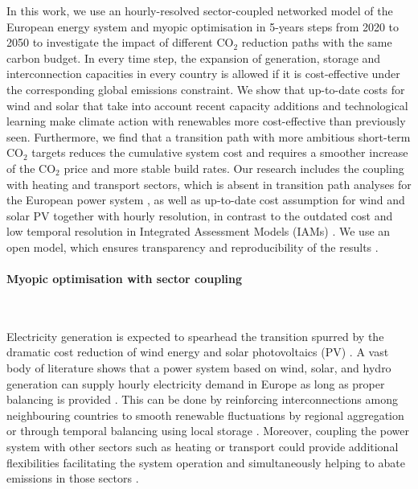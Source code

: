 \documentclass[5p]{elsarticle} %
\begin{document}
In this work, we use an hourly-resolved sector-coupled networked model of the European energy system and myopic optimisation in 5-years steps from 2020 to 2050 to investigate the impact of different CO$_2$ reduction paths with the same carbon budget. In every time step, the expansion of generation, storage and interconnection capacities in every country is allowed if it is cost-effective under the corresponding global emissions constraint. We show that up-to-date costs for wind and solar that take into account recent capacity additions and technological learning make climate action with renewables more cost-effective than previously seen. Furthermore, we find that a transition path with more ambitious short-term CO$_2$ targets reduces the cumulative system cost and requires a smoother increase of the CO$_2$ price and more stable build rates. Our research includes the coupling  with heating and transport sectors, which is absent in transition path analyses for the European power system \cite{Plesmann_2017, Gerbaulet_2019, Poncelet_2016}, as well as up-to-date cost assumption for wind and solar PV together with hourly resolution, in contrast to the outdated cost and low temporal resolution in Integrated Assessment Models (IAMs) \cite{Creutzig_2017, Krey_2019}. We use an open model, which ensures transparency and reproducibility of the results \cite{Pfenninger_2017, Pfenninger_2018}.

\FloatBarrier

\paragraph{\textbf{Myopic optimisation with sector coupling}} \

Electricity generation is expected to spearhead the transition spurred by the dramatic cost reduction of wind energy \cite{Lantz_2012} and solar photovoltaics (PV) \cite{Creutzig_2017, Haegel_2019}. A vast body of literature shows that a power system based on wind, solar, and hydro generation can supply hourly electricity demand in Europe as long as proper balancing is provided \cite{Eriksen_2017, Schlachtberger_2017, Gils_2017a, Brown_response}. This can be done by reinforcing interconnections among neighbouring countries \cite{Rodriguez_2014} to smooth renewable fluctuations by regional aggregation or through temporal balancing using local storage \cite{Rasmussen_2012, Cebulla_2017, Victoria_2019_storage}. Moreover, coupling the power system with other sectors such as heating or transport could provide additional flexibilities facilitating the system operation and simultaneously helping to abate emissions in those sectors \cite{Connolly_2016, Brown_2018, Child_2019}. \\
\end{document}
